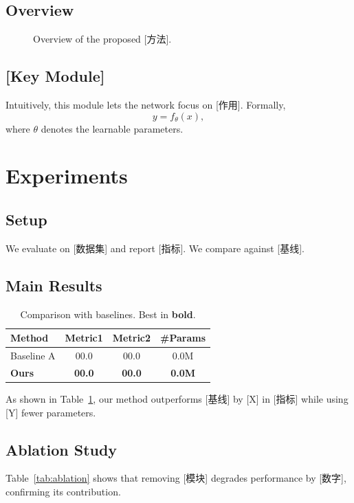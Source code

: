 \documentclass{article}
\begin{document}
\subsection{Overview}
\begin{figure}[t]
  \centering
  \caption{Overview of the proposed [方法].}
  \label{fig:overview}
\end{figure}
\subsection{[Key Module]}
Intuitively, this module lets the network focus on [作用]. Formally,
\begin{equation}
  y = f_{\theta}(x),
  \label{eq:main}
\end{equation}
where $\theta$ denotes the learnable parameters.

\section{Experiments}
\label{sec:exp}
\subsection{Setup}
We evaluate on [数据集] and report [指标]. We compare against [基线].

\subsection{Main Results}
\begin{table}[t]
  \centering
  \caption{Comparison with baselines. Best in \textbf{bold}.}
  \label{tab:main}
  \begin{tabular}{lccc}
    \hline
    Method & Metric1 & Metric2 & \#Params \\
    \hline
    Baseline A & 00.0 & 00.0 & 0.0M \\
    \textbf{Ours} & \textbf{00.0} & \textbf{00.0} & \textbf{0.0M} \\
    \hline
  \end{tabular}
\end{table}
As shown in Table~\ref{tab:main}, our method outperforms [基线] by
[X] in [指标] while using [Y] fewer parameters.

\subsection{Ablation Study}
Table~\ref{tab:ablation} shows that removing [模块] degrades performance
by [数字], confirming its contribution.
\end{document}
